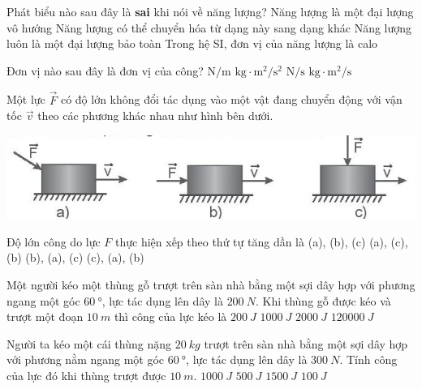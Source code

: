 \begin{ex}
	Phát biểu nào sau đây là \textbf{sai} khi nói về năng lượng?
	\choice
	{Năng lượng là một đại lượng vô hướng}
	{Năng lượng có thể chuyển hóa từ dạng này sang dạng khác}
	{Năng lượng luôn là một đại lượng bảo toàn}
	{\True Trong hệ SI, đơn vị của năng lượng là calo}
	\loigiai{}
\end{ex}
\begin{ex}
	Đơn vị nào sau đây là đơn vị của công?
	\choice
	{$\si{\newton/\meter}$}
	{\True $\si{\kilogram\cdot \meter^2/\second^2}$}
	{$\si{\newton/\second}$}
	{$\si{\kilogram\cdot\meter^2/\second}$}
	\loigiai{}
\end{ex}
\begin{ex}
Một lực $\vec{F}$ có độ lớn không đổi tác dụng vào một vật đang chuyển động với vận tốc $\vec{v}$ theo các phương khác nhau như hình bên dưới.
	\begin{center}
		\includegraphics[width=0.4\linewidth]{../figs/VN10-2023-PH-TP024-P-5}
	\end{center}
	Độ lớn công do lực $F$ thực hiện xếp theo thứ tự tăng dần là
	\choice
	{(a), (b), (c)}
	{(a), (c), (b)}
	{(b), (a), (c)}
	{\True (c), (a), (b)}
	\loigiai{}
\end{ex}
\begin{ex}
Một người kéo một thùng gỗ trượt trên sàn nhà bằng một sợi dây hợp với phương ngang một góc $\SI{60}{\degree}$, lực tác dụng lên dây là $\SI{200}{N}$. Khi thùng gỗ được kéo và trượt một đoạn $\SI{10}{m}$ thì công của lực kéo là	
	\choice
	{$\SI{200}{J}$}
	{\True $\SI{1000}{J}$}
	{$\SI{2000}{J}$}
	{$\SI{120000}{J}$}
\end{ex}	

\begin{ex}
Người ta kéo một cái thùng nặng $\SI{20}{kg}$ trượt trên sàn nhà bằng một sợi dây hợp với phương nằm ngang một góc $\SI{60}{\degree}$, lực tác dụng lên dây là $\SI{300}{N}$. Tính công của lực đó khi thùng trượt được $\SI{10}{m}$. 	
	\choice
	{$\SI{1000}{J}$}
	{$\SI{500}{J}$}
	{\True $\SI{1500}{J}$}
	{$\SI{100}{J}$}
\end{ex}

